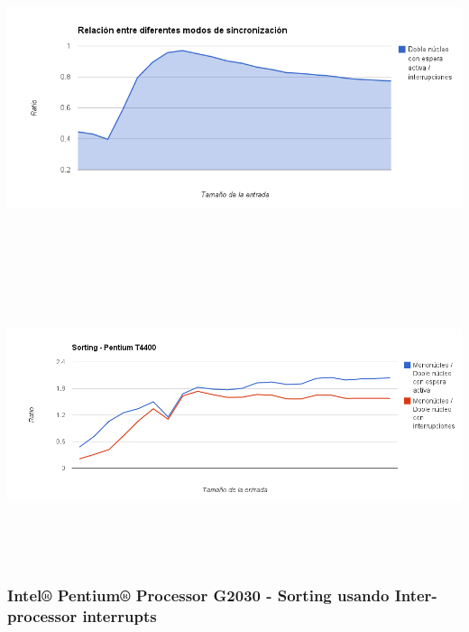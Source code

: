 	\begin{center}
	    \includegraphics[height=8.5cm]{images/pentium_d_mem_ipi.png}
	\end{center}

	\begin{center}
	    \includegraphics[height=8.5cm]{images/pentium_d_gain_mono_mem_mono_ipi.png}
	\end{center}

\subsubsection{Intel® Pentium® Processor G2030 - Sorting usando Inter-processor interrupts}

